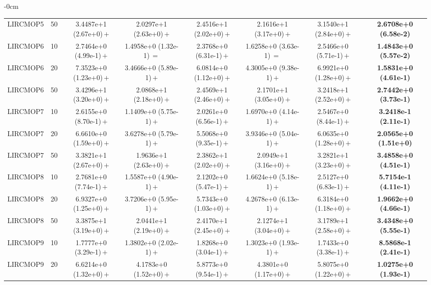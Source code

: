 \begin{table}[!htbp]
\begin{ROneBlock}
\begin{adjustwidth}{-\extralength}{0cm}
\begin{tabular*}{\linewidth}{@{\extracolsep{\fill}}llcccccc@{}}
LIRCMOP5 & 50 & 3.4487e+1 (2.67e+0)\,$+$ & 2.0297e+1 (2.63e+0)\,$+$ & 2.4516e+1 (2.02e+0)\,$+$ & 2.1616e+1 (3.17e+0)\,$+$ & 3.1540e+1 (2.84e+0)\,$+$ & \textbf{2.6708e+0 (6.58e-2)} \\
LIRCMOP6 & 10 & 2.7464e+0 (4.99e-1)\,$+$ & 1.4958e+0 (1.32e-1)\,$=$ & 2.3768e+0 (6.31e-1)\,$+$ & 1.6258e+0 (3.63e-1)\,$=$ & 2.5466e+0 (5.71e-1)\,$+$ & \textbf{1.4843e+0 (5.57e-2)} \\
LIRCMOP6 & 20 & 7.3523e+0 (1.23e+0)\,$+$ & 3.4666e+0 (5.89e-1)\,$+$ & 6.0814e+0 (1.12e+0)\,$+$ & 4.3005e+0 (9.38e-1)\,$+$ & 6.9921e+0 (1.28e+0)\,$+$ & \textbf{1.5831e+0 (4.61e-1)} \\
LIRCMOP6 & 50 & 3.4296e+1 (3.20e+0)\,$+$ & 2.0868e+1 (2.18e+0)\,$+$ & 2.4569e+1 (2.46e+0)\,$+$ & 2.1701e+1 (3.05e+0)\,$+$ & 3.2418e+1 (2.52e+0)\,$+$ & \textbf{2.7442e+0 (3.73e-1)} \\
LIRCMOP7 & 10 & 2.6155e+0 (8.70e-1)\,$+$ & 1.1409e+0 (5.75e-1)\,$+$ & 2.0261e+0 (6.56e-1)\,$+$ & 1.6970e+0 (4.14e-1)\,$+$ & 2.5467e+0 (8.44e-1)\,$+$ & \textbf{3.2418e-1 (2.11e-1)} \\
LIRCMOP7 & 20 & 6.6610e+0 (1.59e+0)\,$+$ & 3.6278e+0 (5.79e-1)\,$+$ & 5.5068e+0 (9.35e-1)\,$+$ & 3.9346e+0 (5.04e-1)\,$+$ & 6.0635e+0 (1.28e+0)\,$+$ & \textbf{2.0565e+0 (1.51e+0)} \\
LIRCMOP7 & 50 & 3.3821e+1 (2.67e+0)\,$+$ & 1.9636e+1 (2.63e+0)\,$+$ & 2.3862e+1 (2.02e+0)\,$+$ & 2.0949e+1 (3.16e+0)\,$+$ & 3.2821e+1 (3.23e+0)\,$+$ & \textbf{3.4858e+0 (4.51e-1)} \\
LIRCMOP8 & 10 & 2.7681e+0 (7.74e-1)\,$+$ & 1.5587e+0 (4.90e-1)\,$+$ & 2.1202e+0 (5.47e-1)\,$+$ & 1.6624e+0 (5.18e-1)\,$+$ & 2.5127e+0 (6.83e-1)\,$+$ & \textbf{5.7154e-1 (4.11e-1)} \\
LIRCMOP8 & 20 & 6.9327e+0 (1.25e+0)\,$+$ & 3.7206e+0 (5.95e-1)\,$+$ & 5.7343e+0 (1.03e+0)\,$+$ & 4.2678e+0 (6.13e-1)\,$+$ & 6.3184e+0 (1.18e+0)\,$+$ & \textbf{1.9662e+0 (4.66e-1)} \\
LIRCMOP8 & 50 & 3.3875e+1 (3.19e+0)\,$+$ & 2.0441e+1 (2.19e+0)\,$+$ & 2.4170e+1 (2.45e+0)\,$+$ & 2.1274e+1 (3.04e+0)\,$+$ & 3.1789e+1 (2.58e+0)\,$+$ & \textbf{3.4348e+0 (5.55e-1)} \\
LIRCMOP9 & 10 & 1.7777e+0 (3.29e-1)\,$+$ & 1.3802e+0 (2.02e-1)\,$+$ & 1.8268e+0 (3.04e-1)\,$+$ & 1.3023e+0 (1.93e-1)\,$+$ & 1.7433e+0 (3.38e-1)\,$+$ & \textbf{8.5868e-1 (2.41e-1)} \\
LIRCMOP9 & 20 & 6.6214e+0 (1.32e+0)\,$+$ & 4.1783e+0 (1.52e+0)\,$+$ & 5.8773e+0 (9.54e-1)\,$+$ & 4.3801e+0 (1.17e+0)\,$+$ & 5.8075e+0 (1.22e+0)\,$+$ & \textbf{1.0275e+0 (1.93e-1)} \\

\end{tabular*}
\end{adjustwidth}
\end{ROneBlock}
\end{table}
